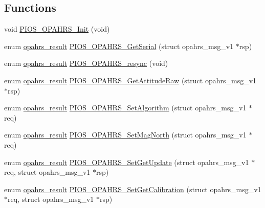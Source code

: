 \subsection*{\-Functions}
\begin{DoxyCompactItemize}
\item 
void \hyperlink{group___p_i_o_s___o_p_a_h_r_s_ga67ca7bfc93dd4242084641433d56f6f7}{\-P\-I\-O\-S\-\_\-\-O\-P\-A\-H\-R\-S\-\_\-\-Init} (void)
\item 
enum \hyperlink{group___p_i_o_s___o_p_a_h_r_s_gaf6fe64d28ea92983e870494d0a5d05bd}{opahrs\-\_\-result} \hyperlink{group___p_i_o_s___o_p_a_h_r_s_ga75623cd403d1d9da708ae4ff42c2f09a}{\-P\-I\-O\-S\-\_\-\-O\-P\-A\-H\-R\-S\-\_\-\-Get\-Serial} (struct opahrs\-\_\-msg\-\_\-v1 $\ast$rsp)
\item 
enum \hyperlink{group___p_i_o_s___o_p_a_h_r_s_gaf6fe64d28ea92983e870494d0a5d05bd}{opahrs\-\_\-result} \hyperlink{group___p_i_o_s___o_p_a_h_r_s_gab167c91b006ac9f0b334289760271b56}{\-P\-I\-O\-S\-\_\-\-O\-P\-A\-H\-R\-S\-\_\-resync} (void)
\item 
enum \hyperlink{group___p_i_o_s___o_p_a_h_r_s_gaf6fe64d28ea92983e870494d0a5d05bd}{opahrs\-\_\-result} \hyperlink{group___p_i_o_s___o_p_a_h_r_s_ga6a2460efc73e4077b41f3db454142bd7}{\-P\-I\-O\-S\-\_\-\-O\-P\-A\-H\-R\-S\-\_\-\-Get\-Attitude\-Raw} (struct opahrs\-\_\-msg\-\_\-v1 $\ast$rsp)
\item 
enum \hyperlink{group___p_i_o_s___o_p_a_h_r_s_gaf6fe64d28ea92983e870494d0a5d05bd}{opahrs\-\_\-result} \hyperlink{group___p_i_o_s___o_p_a_h_r_s_gac7ff2fa43e0673e0b9665cbd587a2c37}{\-P\-I\-O\-S\-\_\-\-O\-P\-A\-H\-R\-S\-\_\-\-Set\-Algorithm} (struct opahrs\-\_\-msg\-\_\-v1 $\ast$req)
\item 
enum \hyperlink{group___p_i_o_s___o_p_a_h_r_s_gaf6fe64d28ea92983e870494d0a5d05bd}{opahrs\-\_\-result} \hyperlink{group___p_i_o_s___o_p_a_h_r_s_ga5f33585c0a6aa5158e015cc5fed5a042}{\-P\-I\-O\-S\-\_\-\-O\-P\-A\-H\-R\-S\-\_\-\-Set\-Mag\-North} (struct opahrs\-\_\-msg\-\_\-v1 $\ast$req)
\item 
enum \hyperlink{group___p_i_o_s___o_p_a_h_r_s_gaf6fe64d28ea92983e870494d0a5d05bd}{opahrs\-\_\-result} \hyperlink{group___p_i_o_s___o_p_a_h_r_s_ga4633695459517529c7841b3d2bb5dccf}{\-P\-I\-O\-S\-\_\-\-O\-P\-A\-H\-R\-S\-\_\-\-Set\-Get\-Update} (struct opahrs\-\_\-msg\-\_\-v1 $\ast$req, struct opahrs\-\_\-msg\-\_\-v1 $\ast$rsp)
\item 
enum \hyperlink{group___p_i_o_s___o_p_a_h_r_s_gaf6fe64d28ea92983e870494d0a5d05bd}{opahrs\-\_\-result} \hyperlink{group___p_i_o_s___o_p_a_h_r_s_gadc32051065da8842b2a3e4416783ff2a}{\-P\-I\-O\-S\-\_\-\-O\-P\-A\-H\-R\-S\-\_\-\-Set\-Get\-Calibration} (struct opahrs\-\_\-msg\-\_\-v1 $\ast$req, struct opahrs\-\_\-msg\-\_\-v1 $\ast$rsp)

\end{DoxyCompactItemize}
